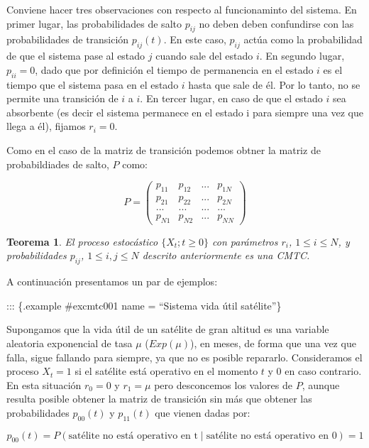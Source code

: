 \documentclass[
]{book}
\newtheorem{theorem}{Teorema}[chapter]
\theoremstyle{definition}
\theoremstyle{definition}
\theoremstyle{definition}
\theoremstyle{definition}
\theoremstyle{remark}
\begin{document}
Conviene hacer tres observaciones con respecto al funcionaminto del sistema. En primer lugar, las probabilidades de salto \(p_{ij}\) no deben deben confundirse con las probabilidades de transición \(p_{ij}(t)\). En este caso, \(p_{ij}\) actúa como la probabilidad de que el sistema pase al estado \(j\) cuando sale del estado \(i\). En segundo lugar, \(p_{ii} = 0\), dado que por definición el tiempo de permanencia en el estado \(i\) es el tiempo que el sistema pasa en el estado \(i\) hasta que sale de él. Por lo tanto, no se permite una transición de \(i\) a \(i\). En tercer lugar, en caso de que el estado \(i\) sea absorbente (es decir el sistema permanece en el estado i para siempre una vez que llega a él), fijamos \(r_i = 0\).

Como en el caso de la matriz de transición podemos obtner la matriz de probabildiades de salto, \(P\) como:

\[P = 
\begin{pmatrix}
p_{11} & p_{12} & ... & p_{1N}\\
p_{21} & p_{22} & ... & p_{2N}\\
... & ... & ... & ...\\
p_{N1} & p_{N2} & ... & p_{NN}
\end{pmatrix}\]

\begin{theorem}
\protect\hypertarget{thm:thecmtc001}{}\label{thm:thecmtc001}El proceso estocástico \(\{X_t; t \geq 0\}\) con parámetros \(r_i\), \(1 \leq i \leq N\), y probabilidades \(p_{ij}\), \(1 \leq i,j \leq N\) descrito anteriormente es una CMTC.
\end{theorem}

A continuación presentamos un par de ejemplos:

::: \{.example \#excmtc001 name = ``Sistema vida útil satélite''\}

Supongamos que la vida útil de un satélite de gran altitud es una variable aleatoria exponencial de tasa \(\mu\) (\(Exp(\mu)\)), en meses, de forma que una vez que falla, sigue fallando para siempre, ya que no es posible repararlo. Consideramos el proceso \(X_t = 1\) si el satélite está operativo en el momento \(t\) y 0 en caso contrario. En esta situación \(r_0 = 0\) y \(r_1 = \mu\) pero desconcemos los valores de \(P\), aunque resulta posible obtener la matriz de transición sin más que obtener las probabilidades \(p_{00}(t)\) y \(p_{11}(t)\) que vienen dadas por:

\[p_{00}(t) = P(\text{satélite no está operativo en t} \mid \text{satélite no está operativo en 0}) = 1\]
\end{document}
